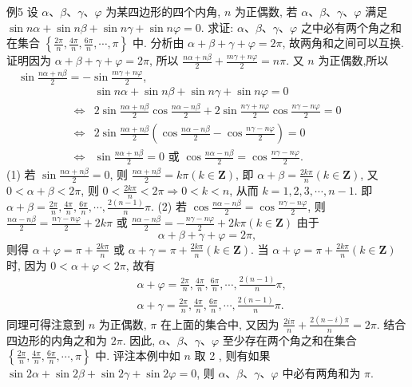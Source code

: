 例5 设 $\alpha 、 \beta 、 \gamma 、 \varphi$ 为某四边形的四个内角, $n$ 为正偶数, 若 $\alpha 、 \beta 、 \gamma 、 \varphi$ 满足 $\sin n \alpha+\sin n \beta+\sin n \gamma+\sin n \varphi=0$.
求证: $\alpha 、 \beta 、 \gamma 、 \varphi$ 之中必有两个角之和在集合 $\left\{\frac{2 \pi}{n}, \frac{4 \pi}{n}, \frac{6 \pi}{n}, \cdots, \pi\right\}$ 中.
分析由 $\alpha+\beta+\gamma+\varphi=2 \pi$, 故两角和之间可以互换.
证明因为 $\alpha+\beta+\gamma+\varphi=2 \pi$, 所以 $\frac{n \alpha+n \beta}{2}+\frac{m \gamma+n \varphi}{2}=n \pi$.
又 $n$ 为正偶数,所以 $\quad \sin \frac{n \alpha+n \beta}{2}=-\sin \frac{m \gamma+n \varphi}{2}$,
$$
\begin{aligned}
& \sin n \alpha+\sin n \beta+\sin n \gamma+\sin n \varphi=0 \\
\Leftrightarrow & 2 \sin \frac{n \alpha+n \beta}{2} \cos \frac{n \alpha-n \beta}{2}+2 \sin \frac{n \gamma+n \varphi}{2} \cos \frac{n \gamma-n \varphi}{2}=0 \\
\Leftrightarrow & 2 \sin \frac{n \alpha+n \beta}{2}\left(\cos \frac{n \alpha-n \beta}{2}-\cos \frac{n \gamma-n \varphi}{2}\right)=0 \\
\Leftrightarrow & \sin \frac{n \alpha+n \beta}{2}=0 \text { 或 } \cos \frac{n \alpha-n \beta}{2}=\cos \frac{n \gamma-n \varphi}{2} .
\end{aligned}
$$
(1) 若 $\sin \frac{n \alpha+n \beta}{2}=0$, 则 $\frac{n \alpha+n \beta}{2}=k \pi(k \in \mathbf{Z})$, 即 $\alpha+\beta=\frac{2 k \pi}{n}(k \in \mathbf{Z})$, 又 $0<\alpha+\beta<2 \pi$, 则 $0<\frac{2 k \pi}{n}<2 \pi \Rightarrow 0<k<n$, 从而 $k=1,2,3, \cdots, n-1$. 即 $\alpha+\beta=\frac{2 \pi}{n}, \frac{4 \pi}{n}, \frac{6 \pi}{n}, \cdots, \frac{2(n-1)}{n} \pi$.
(2) 若 $\cos \frac{n \alpha-n \beta}{2}=\cos \frac{n \gamma-n \varphi}{2}$, 则 $\frac{n \alpha-n \beta}{2}=\frac{n \gamma-n \varphi}{2}+2 k \pi$ 或 $\frac{n \alpha-n \beta}{2}=-\frac{n \gamma-n \varphi}{2}+2 k \pi(k \in \mathbf{Z})$
由于
$$
\alpha+\beta+\gamma+\varphi=2 \pi,
$$
则得 $\alpha+\varphi=\pi+\frac{2 k \pi}{n}$ 或 $\alpha+\gamma=\pi+\frac{2 k \pi}{n}(k \in \mathbf{Z})$.
当 $\alpha+\varphi=\pi+\frac{2 k \pi}{n}(k \in \mathbf{Z})$ 时, 因为 $0<\alpha+\varphi<2 \pi$, 故有
$$
\begin{aligned}
& \alpha+\varphi=\frac{2 \pi}{n}, \frac{4 \pi}{n}, \frac{6 \pi}{n}, \cdots, \frac{2(n-1)}{n} \pi, \\
& \alpha+\gamma=\frac{2 \pi}{n}, \frac{4 \pi}{n}, \frac{6 \pi}{n}, \cdots, \frac{2(n-1)}{n} \pi .
\end{aligned}
$$
同理可得注意到 $n$ 为正偶数, $\pi$ 在上面的集合中, 又因为 $\frac{2 i \pi}{n}+\frac{2(n-i) \pi}{n}=2 \pi$. 结合四边形的内角之和为 $2 \pi$.
因此, $\alpha 、 \beta 、 \gamma 、 \varphi$ 至少存在两个角之和在集合 $\left\{\frac{2 \pi}{n}, \frac{4 \pi}{n}, \frac{6 \pi}{n}, \cdots, \pi\right\}$ 中.
评注本例中如 $n$ 取 2 , 则有如果 $\sin 2 \alpha+\sin 2 \beta+\sin 2 \gamma+\sin 2 \varphi=0$, 则 $\alpha 、 \beta 、 \gamma 、 \varphi$ 中必有两角和为 $\pi$.



